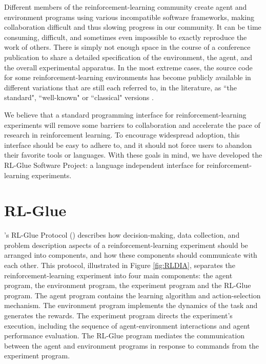 \documentclass[twoside,11pt]{article}
\begin{document}
Different members of the reinforcement-learning community create agent and environment programs using various incompatible software frameworks, making collaboration difficult and thus slowing progress in our community. It  can be time consuming, difficult, and sometimes even impossible to exactly reproduce the work of others.  There is simply not enough space in the course of a conference publication to share a detailed specification of the environment, the agent, and the overall experimental apparatus.
In the most extreme cases, the source code for some reinforcement-learning environments has become publicly available in different variations that are still each referred to, in the literature, as ``the standard", ``well-known" or ``classical"  versions \citep{whiteThesis}.

We believe that a standard programming interface for reinforcement-learning experiments will remove some barriers to collaboration and accelerate the pace of research in reinforcement learning.  To encourage widespread adoption, this interface should be easy to adhere to, and it should not force users to abandon their favorite tools or languages.  With these goals in mind, we have developed the RL-Glue Software Project: a language independent interface for reinforcement-learning experiments.





	 

\section{RL-Glue}

\citeauthor{whiteThesis}'s RL-Glue Protocol (\citeyear{whiteThesis}) describes how decision-making, data collection, and problem description aspects of a reinforcement-learning experiment should be arranged into components, and how these components should communicate with each other.  This protocol, illustrated in Figure \ref{fig:RLDIA}, separates the reinforcement-learning experiment into four main components: the agent program, the environment program, the experiment program and the RL-Glue program. The agent program contains the learning algorithm and action-selection mechanism. The environment program implements the dynamics of the task and generates the rewards. The experiment program directs the experiment's execution, including the sequence of agent-environment interactions and agent performance evaluation.  The RL-Glue program mediates the communication between the agent and environment programs in response to commands from the experiment program. 
\end{document}
